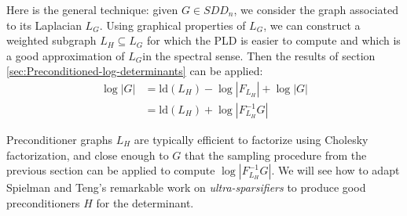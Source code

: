 Here is the general technique: given $G\in SDD_{n}$, we consider
the graph associated to its Laplacian $L_{G}$. Using graphical properties
of $L_{G}$, we can construct a weighted subgraph $L_{H}\subseteq L_{G}$
for which the PLD is easier to compute and which is a good approximation
of $L_{G}$in the spectral sense. Then the results of section \ref{sec:Preconditioned-log-determinants}
can be applied:
\begin{align*}
\log\left|G\right| & =\text{ld}\left(L_{H}\right)-\log\left|F_{L_{H}}\right|+\log\left|G\right|\\
 & =\text{ld}\left(L_{H}\right)+\log\left|F_{L_{H}}^{-1}G\right|
\end{align*}


Preconditioner graphs $L_{H}$ are typically efficient to factorize
using Cholesky factorization, and close enough to $G$ that the sampling
procedure from the previous section can be applied to compute $\log\left|F_{L_{H}}^{-1}G\right|$.
We will see how to adapt Spielman and Teng's remarkable work on \emph{ultra-sparsifiers}
to produce good preconditioners $H$ for the determinant. 
